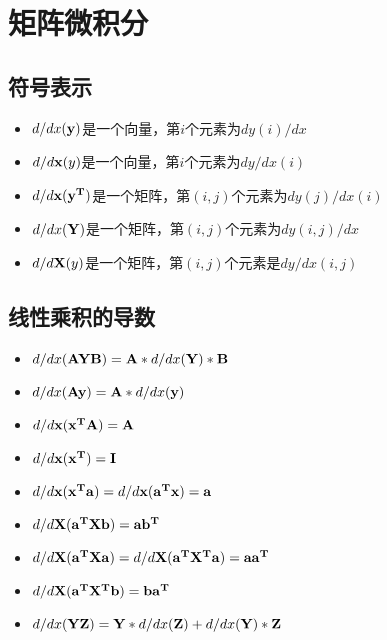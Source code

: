\documentclass[fontset=none,oneside]{book}
\begin{document}
\section{矩阵微积分}
\subsection{符号表示}
\begin{shaded}
\begin{itemize}
\item $d/dx(\bf y)$是一个向量，第$i$个元素为$dy(i)/dx$
\item $d/d{\bf x}(y)$是一个向量，第$i$个元素为$dy/dx(i)$
\item $d/d{\bf x}({\bf y^T})$是一个矩阵，第$(i,j)$个元素为$dy(j)/dx(i)$
\item $d/dx({\bf Y})$是一个矩阵，第$(i,j)$个元素为$dy(i,j)/dx$
\item $d/d{\bf X}(y)$是一个矩阵，第$(i,j)$个元素是$dy/dx(i,j)$
\end{itemize}
\end{shaded}
\subsection{线性乘积的导数}
\begin{itemize}
\item $d/dx({\bf AYB})={\bf A}*d/dx({\bf Y})*{\bf B}$
\item $d/dx({\bf Ay})={\bf A}*d/dx({\bf y})$
\item $d/d{\bf x}({\bf x^TA})={\bf A}$
\item $d/d{\bf x}({\bf x^T})={\bf I}$
\item $d/d{\bf x}({\bf x^Ta})=d/d{\bf x}({\bf a^Tx})={\bf a}$
\item $d/d{\bf X}({\bf a^TXb})={\bf ab^T}$
\item $d/d{\bf X}({\bf a^TXa})=d/d{\bf X}({\bf a^TX^Ta})={\bf aa^T}$
\item $d/d{\bf X}({\bf a^TX^Tb})={\bf ba^T}$
\item $d/dx({\bf YZ})={\bf Y}*d/dx({\bf Z})+d/dx({\bf Y})*{\bf Z}$
\end{itemize}
\end{document}
